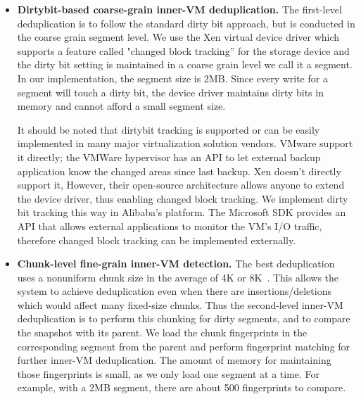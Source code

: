 \begin{itemize}
\item \textbf{Dirtybit-based coarse-grain inner-VM deduplication.}
The first-level deduplication is to follow the standard dirty bit approach, but is conducted
in the coarse grain segment level.
We use the  Xen virtual device driver which supports a feature called "changed block tracking''
for the storage device
and the dirty bit setting is maintained in a coarse grain level we call it a segment.
In our implementation, the segment size is 2MB. 
Since every write for a segment will touch a dirty bit, the device driver maintains dirty bits in memory
and cannot afford a small segment  size.

It should be noted that dirtybit tracking is supported or can be easily implemented in many 
major virtualization solution vendors. 
VMware support it directly; the VMWare hypervisor has an API to let external backup application know 
the changed areas since last backup. Xen doesn't directly support it, However, their open-source 
architecture allows anyone to extend the device driver, thus enabling changed block tracking. 
We implement dirty bit tracking this way in Alibaba's platform.  
The Microsoft SDK provides an API that allows external applications to monitor 
the VM's I/O traffic, therefore changed block tracking can be implemented externally. 

\item \textbf{Chunk-level fine-grain inner-VM detection.}
The best deduplication uses a nonuniform chunk size 
in the average of 4K or 8K~\cite{??}. This allows the system to
achieve deduplication even when there are insertions/deletions which would
affect many fixed-size chunks.
Thus the second-level inner-VM deduplication is to perform this chunking for
dirty segments, and to compare the snapshot with its parent. 
We load the chunk fingerprints in the corresponding segment from the
parent and perform fingerprint matching for further inner-VM deduplication.
The amount of memory for maintaining those fingerprints  is small, as we only
load one segment at a time.
For example, with a 2MB segment, there are about 500 fingerprints to compare.


%


\end{itemize}
